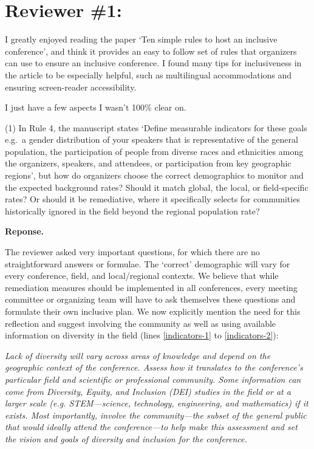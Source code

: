 \documentclass{article}
\newenvironment{Reply}{\noindent\color{BlueViolet}\textbf{Reponse.}}{\vspace{1em}}
\begin{document}
\section*{Reviewer \#1:}
I greatly enjoyed reading the paper `Ten simple rules to host an inclusive conference', and think it provides an easy to follow set of rules that organizers can use to ensure an inclusive conference. I found many tips for inclusiveness in the article to be especially helpful, such as multilingual accommodations and ensuring screen-reader accessibility.

I just have a few aspects I wasn't 100\% clear on.

(1) In Rule 4, the manuscript states `Define measurable indicators for these goals e.g.\ a gender distribution of your speakers that is representative of the general population, the participation of people from diverse races and ethnicities among the organizers, speakers, and attendees, or participation from key geographic regions', but how do organizers choose the correct demographics to monitor and the expected background rates? Should it match global, the local, or field-specific rates? Or should it be remediative, where it specifically selects for communities historically ignored in the field beyond the regional population rate?

\begin{Reply}

   The reviewer asked very important questions, for which there are no straightforward answers or formulae. 
   The `correct' demographic will vary for every conference, field, and local/regional contexts. 
   We believe that while remediation measures should be implemented in all conferences, every meeting committee or organizing team will have to ask themselves these questions and formulate their own inclusive plan.
   We now explicitly mention the need for this reflection and suggest involving the community as well as using available information on diversity in the field (lines \ref{indicators-1} to \ref{indicators-2}):
   
   \textit{
    Lack of diversity will vary across areas of knowledge and depend on the geographic context of the conference.
    Assess how it translates to the conference's particular field and scientific or professional community.
    Some information can come from Diversity, Equity, and Inclusion (DEI) studies in the field or at a larger scale (e.g. STEM---science, technology, engineering, and mathematics) if it exists. 
    Most importantly, involve the community---the subset of the general public that would ideally attend the conference---to help make this assessment and set the vision and goals of diversity and inclusion for the conference.
    }
   
\end{Reply}
\end{document}
